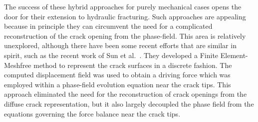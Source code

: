     The success of these hybrid approaches for purely mechanical cases opens the door for their extension to hydraulic fracturing.  Such approaches are appealing because in principle they can circumvent the need for a complicated reconstruction of the crack opening from the phase-field.  This area is relatively unexplored, although there have been some recent efforts that are similar in spirit, such as the recent work of Sun et al.\ \cite{sun2020hybrid}.  They developed a Finite Element-Meshfree method to represent the crack surfaces in a discrete fashion. The computed displacement field was used to obtain a driving force which was employed within a phase-field evolution equation near the crack tips. This approach eliminated the need for the reconstruction of crack openings from the diffuse crack representation, but it also largely decoupled the phase field from the equations governing the force balance near the crack tips. 











